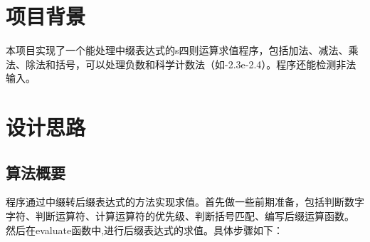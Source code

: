 \documentclass[UTF8]{ctexart}
\begin{document}
\pagestyle{fancy}
\fancyhead{}


\section{项目背景}
本项目实现了一个能处理中缀表达式的s四则运算求值程序，包括加法、减法、乘法、除法和括号，可以处理负数和科学计数法（如-2.3e-2.4）。程序还能检测非法输入。

\section{设计思路}
\subsection{算法概要}
程序通过中缀转后缀表达式的方法实现求值。首先做一些前期准备，包括判断数字字符、判断运算符、计算运算符的优先级、判断括号匹配、编写后缀运算函数。
然后在evaluate函数中,进行后缀表达式的求值。具体步骤如下：
\end{document}
